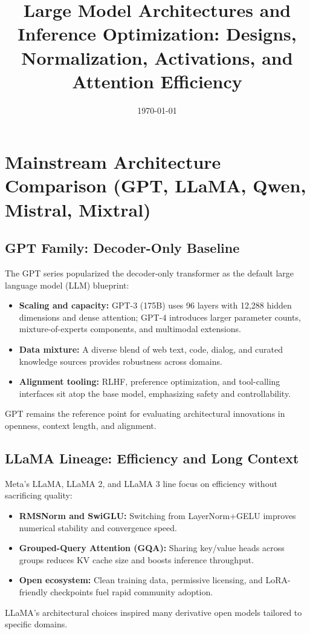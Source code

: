 \documentclass{article}
\title{Large Model Architectures and Inference Optimization: Designs, Normalization, Activations, and Attention Efficiency}
\author{}
\date{\today}
\begin{document}
\maketitle

\section{Mainstream Architecture Comparison (GPT, LLaMA, Qwen, Mistral, Mixtral)}
\subsection{GPT Family: Decoder-Only Baseline}
The GPT series popularized the decoder-only transformer as the default large language model (LLM) blueprint:
\begin{itemize}
  \item \textbf{Scaling and capacity:} GPT-3 (175B) uses 96 layers with 12,288 hidden dimensions and dense attention; GPT-4 introduces larger parameter counts, mixture-of-experts components, and multimodal extensions.
  \item \textbf{Data mixture:} A diverse blend of web text, code, dialog, and curated knowledge sources provides robustness across domains.
  \item \textbf{Alignment tooling:} RLHF, preference optimization, and tool-calling interfaces sit atop the base model, emphasizing safety and controllability.
\end{itemize}
GPT remains the reference point for evaluating architectural innovations in openness, context length, and alignment.

\subsection{LLaMA Lineage: Efficiency and Long Context}
Meta's LLaMA, LLaMA 2, and LLaMA 3 line focus on efficiency without sacrificing quality:
\begin{itemize}
  \item \textbf{RMSNorm and SwiGLU:} Switching from LayerNorm+GELU improves numerical stability and convergence speed.
  \item \textbf{Grouped-Query Attention (GQA):} Sharing key/value heads across groups reduces KV cache size and boosts inference throughput.
  \item \textbf{Open ecosystem:} Clean training data, permissive licensing, and LoRA-friendly checkpoints fuel rapid community adoption.
\end{itemize}
LLaMA's architectural choices inspired many derivative open models tailored to specific domains.
\end{document}
